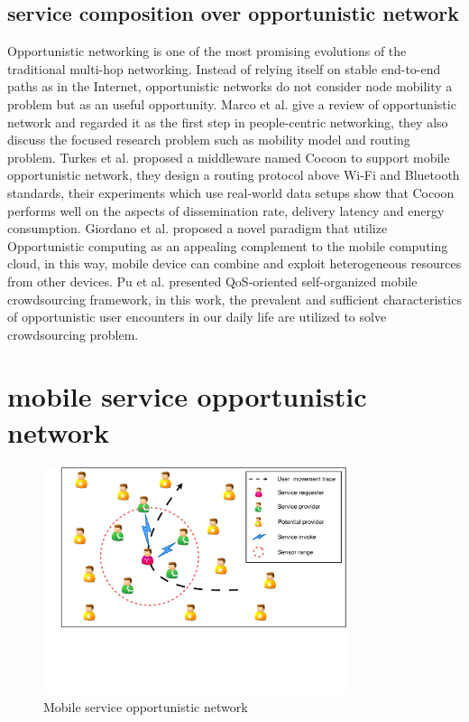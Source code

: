 \documentclass[10pt,journal,compsoc]{IEEEtran}
\begin{document}
\subsection{service composition over opportunistic network}
Opportunistic networking is one of the most promising evolutions of the traditional multi-hop networking. Instead of relying itself on stable end-to-end paths as in the Internet, opportunistic networks do not consider node mobility a problem but as an useful opportunity. 
Marco et al. \cite{Conti2014} give a review of opportunistic network and regarded it as the first step in people-centric networking, they also discuss the focused research problem such as mobility model and routing problem.
Turkes et al. \cite{turkes2016cocoon} proposed a middleware named Cocoon to support mobile opportunistic network, they design a routing protocol above Wi-Fi and Bluetooth standards, their experiments which use real-world data setups show that Cocoon performs well on the aspects of dissemination rate, delivery latency and energy consumption.
Giordano et al. \cite{giordano2011human} proposed a novel paradigm that utilize Opportunistic computing as an appealing complement to the mobile computing cloud, in this way, mobile device can combine and exploit heterogeneous resources from other devices.
Pu et al. \cite{Pu2017crowd} presented QoS-oriented self-organized mobile crowdsourcing framework, in this work, the prevalent and sufficient characteristics of opportunistic user encounters in our daily life are utilized to solve crowdsourcing problem.


\section{mobile service opportunistic network}

\begin{figure}[!t]
\centering
\includegraphics[width=3.5in]{./img/pic2.pdf}
\caption{Mobile service opportunistic network}
\label{fig_mson}
\end{figure}
\end{document}
